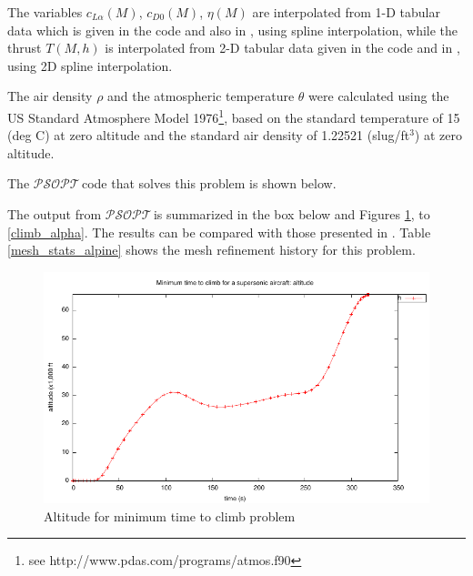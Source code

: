 \documentclass[a4paper,11pt]{report}    %
\newcommand{\psopt}{$\mathcal{PSOPT}$\,}  %
\newenvironment{shadedframe}{%
  \def\FrameCommand{\fcolorbox{black}{shadecolor}}%
  \MakeFramed {\FrameRestore}}
{\endMakeFramed}
\begin{document}
The variables $c_{L\alpha}(M)$, $c_{D0}(M)$, $\eta(M)$ are interpolated from 1-D tabular data which
is given in the code and also in \cite{Betts:10}, using spline interpolation, while the thrust $T(M,h)$ 
is interpolated from 2-D tabular data given in the code and in \cite{Betts:10}, using 2D spline interpolation.

The air density $\rho$ and the atmospheric temperature $\theta$ were calculated using the US Standard Atmosphere Model 1976\footnote{see http://www.pdas.com/programs/atmos.f90}, 
based on the standard temperature of 15 (deg C) at zero altitude and the standard air density of  1.22521 (slug/ft$^3$) at zero altitude.

The \psopt code that solves this problem is shown below.  

\tiny
\begin{shadedframe}

\end{shadedframe}
\normalsize


The output from \psopt is summarized in the box below and Figures \ref{climb_alt}, to \ref{climb_alpha}. The results
can be compared with those presented in \cite{Betts:10}. Table \ref{mesh_stats_alpine} shows the mesh refinement history 
for this problem.



\begin{shadedframe}

\end{shadedframe}


\begin{figure}
  \centering
  \includegraphics{../examples/climb/climb_altitude}
  \caption{Altitude for minimum time to climb problem}
  \label{climb_alt}
\end{figure}
\end{document}
